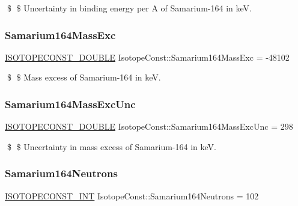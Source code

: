 \$ \$ Uncertainty in binding energy per A of Samarium-\/164 in keV. \mbox{\label{group___isotope_const-_samarium-_sm164_ga13ae771b1173d2642081cd2161b2e242}} 
\subsubsection{\texorpdfstring{Samarium164\+Mass\+Exc}{Samarium164MassExc}}
{\footnotesize\ttfamily \mbox{\hyperlink{group___isotope_const-_macros_ga8f45a7272ce02c0b4c65c44636ed719a}{I\+S\+O\+T\+O\+P\+E\+C\+O\+N\+S\+T\+\_\+\+D\+O\+U\+B\+LE}} Isotope\+Const\+::\+Samarium164\+Mass\+Exc = -\/48102}

\$ \$ Mass excess of Samarium-\/164 in keV. \mbox{\label{group___isotope_const-_samarium-_sm164_ga90de2766ce02115fd2054ca26aca03a9}} 
\subsubsection{\texorpdfstring{Samarium164\+Mass\+Exc\+Unc}{Samarium164MassExcUnc}}
{\footnotesize\ttfamily \mbox{\hyperlink{group___isotope_const-_macros_ga8f45a7272ce02c0b4c65c44636ed719a}{I\+S\+O\+T\+O\+P\+E\+C\+O\+N\+S\+T\+\_\+\+D\+O\+U\+B\+LE}} Isotope\+Const\+::\+Samarium164\+Mass\+Exc\+Unc = 298}

\$ \$ Uncertainty in mass excess of Samarium-\/164 in keV. \mbox{\label{group___isotope_const-_samarium-_sm164_gaa74be8ea3d451a6d528ab0945bc38d2c}} 
\subsubsection{\texorpdfstring{Samarium164\+Neutrons}{Samarium164Neutrons}}
{\footnotesize\ttfamily \mbox{\hyperlink{group___isotope_const-_macros_ga5f18360b3e99483a35c32d789e62621c}{I\+S\+O\+T\+O\+P\+E\+C\+O\+N\+S\+T\+\_\+\+I\+NT}} Isotope\+Const\+::\+Samarium164\+Neutrons = 102}

